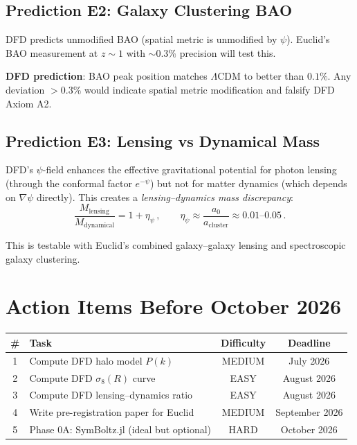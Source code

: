 \documentclass[11pt,a4paper]{article}
\begin{document}
\subsection{Prediction E2: Galaxy Clustering BAO}

DFD predicts unmodified BAO (spatial metric is unmodified by $\psi$). Euclid's BAO measurement at $z \sim 1$ with $\sim 0.3\%$ precision will test this.

\textbf{DFD prediction}: BAO peak position matches $\Lambda$CDM to better than $0.1\%$. Any deviation $> 0.3\%$ would indicate spatial metric modification and falsify DFD Axiom A2.

\subsection{Prediction E3: Lensing vs Dynamical Mass}

DFD's $\psi$-field enhances the effective gravitational potential for photon lensing (through the conformal factor $e^{-\psi}$) but not for matter dynamics (which depends on $\nabla\psi$ directly). This creates a \emph{lensing--dynamics mass discrepancy}:
\begin{equation}
\frac{M_{\mathrm{lensing}}}{M_{\mathrm{dynamical}}} = 1 + \eta_\psi\,,\qquad \eta_\psi \approx \frac{a_0}{a_{\mathrm{cluster}}} \approx 0.01\text{--}0.05\,.
\end{equation}

This is testable with Euclid's combined galaxy--galaxy lensing and spectroscopic galaxy clustering.

\section{Action Items Before October 2026}

\begin{center}
\begin{tabular}{clcc}
\toprule
\textbf{\#} & \textbf{Task} & \textbf{Difficulty} & \textbf{Deadline} \\
\midrule
1 & Compute DFD halo model $P(k)$ & MEDIUM & July 2026 \\
2 & Compute DFD $\sigma_8(R)$ curve & EASY & August 2026 \\
3 & Compute DFD lensing--dynamics ratio & EASY & August 2026 \\
4 & Write pre-registration paper for Euclid & MEDIUM & September 2026 \\
5 & Phase 0A: SymBoltz.jl (ideal but optional) & HARD & October 2026 \\
\bottomrule
\end{tabular}
\end{center}
\end{document}
